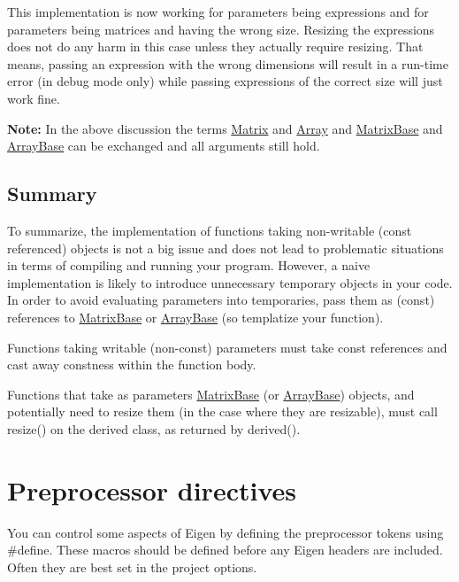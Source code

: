  This implementation is now working for parameters being expressions and for parameters being matrices and having the wrong size. Resizing the expressions does not do any harm in this case unless they actually require resizing. That means, passing an expression with the wrong dimensions will result in a run-\/time error (in debug mode only) while passing expressions of the correct size will just work fine.

{\bfseries Note\+:} In the above discussion the terms \hyperlink{group___core___module_class_eigen_1_1_matrix}{Matrix} and \hyperlink{group___core___module_class_eigen_1_1_array}{Array} and \hyperlink{group___core___module_class_eigen_1_1_matrix_base}{Matrix\+Base} and \hyperlink{group___core___module_class_eigen_1_1_array_base}{Array\+Base} can be exchanged and all arguments still hold.\hypertarget{_topic_function_taking_eigen_types_TopicSummary}{}\subsection{Summary}\label{_topic_function_taking_eigen_types_TopicSummary}

\begin{DoxyItemize}
\item To summarize, the implementation of functions taking non-\/writable (const referenced) objects is not a big issue and does not lead to problematic situations in terms of compiling and running your program. However, a naive implementation is likely to introduce unnecessary temporary objects in your code. In order to avoid evaluating parameters into temporaries, pass them as (const) references to \hyperlink{group___core___module_class_eigen_1_1_matrix_base}{Matrix\+Base} or \hyperlink{group___core___module_class_eigen_1_1_array_base}{Array\+Base} (so templatize your function).
\item Functions taking writable (non-\/const) parameters must take const references and cast away constness within the function body.
\item Functions that take as parameters \hyperlink{group___core___module_class_eigen_1_1_matrix_base}{Matrix\+Base} (or \hyperlink{group___core___module_class_eigen_1_1_array_base}{Array\+Base}) objects, and potentially need to resize them (in the case where they are resizable), must call resize() on the derived class, as returned by derived(). 
\end{DoxyItemize}\hypertarget{TopicPreprocessorDirectives}{}\section{Preprocessor directives}\label{TopicPreprocessorDirectives}
You can control some aspects of Eigen by defining the preprocessor tokens using {\ttfamily \#define}. These macros should be defined before any Eigen headers are included. Often they are best set in the project options.

